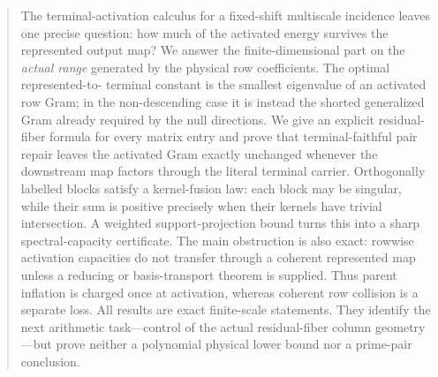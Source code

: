 \begin{abstract}
The terminal-activation calculus for a fixed-shift multiscale incidence leaves
one precise question: how much of the activated energy survives the represented
output map?  We answer the finite-dimensional part on the \emph{actual range}
generated by the physical row coefficients.  The optimal represented-to-
terminal constant is the smallest eigenvalue of an activated row Gram; in the
non-descending case it is instead the shorted generalized Gram already required
by the null directions.  We give an explicit residual-fiber formula for every
matrix entry and prove that terminal-faithful pair repair leaves the activated
Gram exactly unchanged whenever the downstream map factors through the literal
terminal carrier.  Orthogonally labelled blocks satisfy a kernel-fusion law:
each block may be singular, while their sum is positive precisely when their
kernels have trivial intersection.  A weighted support-projection bound turns
this into a sharp spectral-capacity certificate.  The main obstruction is also
exact: rowwise activation capacities do not transfer through a coherent
represented map unless a reducing or basis-transport theorem is supplied.
Thus parent inflation is charged once at activation, whereas coherent row
collision is a separate loss.  All results are exact finite-scale statements.
They identify the next arithmetic task---control of the actual residual-fiber
column geometry---but prove neither a polynomial physical lower bound nor a
prime-pair conclusion.
\end{abstract}


